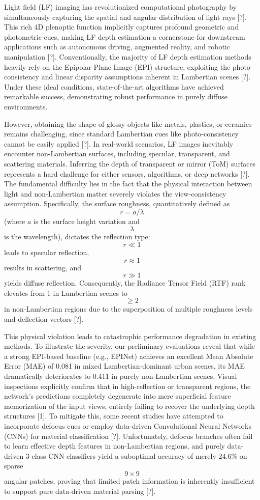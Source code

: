 \documentclass[journal]{IEEEtran}
\begin{document}
Light field (LF) imaging has revolutionized computational photography by simultaneously capturing the spatial and angular distribution of light rays [?]. This rich 4D plenoptic function implicitly captures profound geometric and photometric cues, making LF depth estimation a cornerstone for downstream applications such as autonomous driving, augmented reality, and robotic manipulation [?]. Conventionally, the majority of LF depth estimation methods heavily rely on the Epipolar Plane Image (EPI) structure, exploiting the photo-consistency and linear disparity assumptions inherent in Lambertian scenes [?]. Under these ideal conditions, state-of-the-art algorithms have achieved remarkable success, demonstrating robust performance in purely diffuse environments.

However, obtaining the shape of glossy objects like metals, plastics, or ceramics remains challenging, since standard Lambertian cues like photo-consistency cannot be easily applied [?]. In real-world scenarios, LF images inevitably encounter non-Lambertian surfaces, including specular, transparent, and scattering materials. Inferring the depth of transparent or mirror (ToM) surfaces represents a hard challenge for either sensors, algorithms, or deep networks [?]. The fundamental difficulty lies in the fact that the physical interaction between light and non-Lambertian matter severely violates the view-consistency assumption. Specifically, the surface roughness, quantitatively defined as \[
r = a/\lambda
\] (where \(a\) is the surface height variation and \[
\lambda
\] is the wavelength), dictates the reflection type: \[
r \ll 1
\] leads to specular reflection, \[
r \approx 1
\] results in scattering, and \[
r \gg 1
\] yields diffuse reflection. Consequently, the Radiance Tensor Field (RTF) rank elevates from 1 in Lambertian scenes to \[
\geq 2
\] in non-Lambertian regions due to the superposition of multiple roughness levels and deflection vectors [?].

This physical violation leads to catastrophic performance degradation in existing methods. To illustrate the severity, our preliminary evaluations reveal that while a strong EPI-based baseline (e.g., EPINet) achieves an excellent Mean Absolute Error (MAE) of 0.081 in mixed Lambertian-dominant urban scenes, its MAE dramatically deteriorates to 0.411 in purely non-Lambertian scenes. Visual inspections explicitly confirm that in high-reflection or transparent regions, the network's predictions completely degenerate into mere superficial feature memorization of the input views, entirely failing to recover the underlying depth structures [1]. To mitigate this, some recent studies have attempted to incorporate defocus cues or employ data-driven Convolutional Neural Networks (CNNs) for material classification [?]. Unfortunately, defocus branches often fail to learn effective depth features in non-Lambertian regions, and purely data-driven 3-class CNN classifiers yield a suboptimal accuracy of merely 24.6\% on sparse \[
9 \times 9
\] angular patches, proving that limited patch information is inherently insufficient to support pure data-driven material parsing [?].
\end{document}
